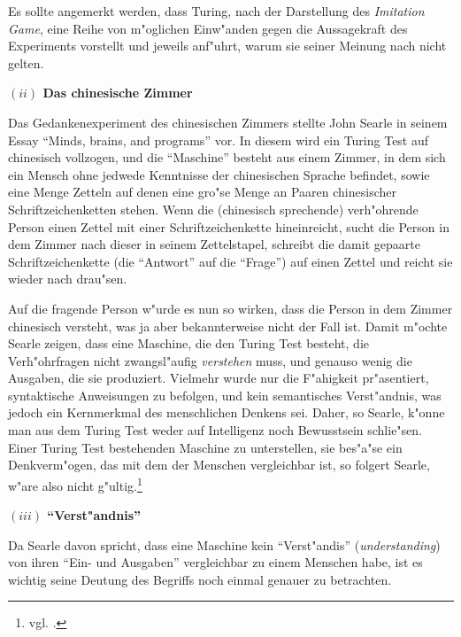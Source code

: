 \documentclass[a4paper, emulatestandardclasses, 12pt]{scrartcl}
\begin{document}
\begin{onehalfspace}
Es sollte angemerkt werden, dass Turing, nach der Darstellung des \emph{Imitation Game}, eine Reihe von m"oglichen Einw"anden gegen die Aussagekraft des Experiments vorstellt und jeweils anf"uhrt, warum sie seiner Meinung nach nicht gelten. %

\vspace{5mm}
\noindent\textbf{$(ii)$ Das chinesische Zimmer}

\noindent Das Gedankenexperiment des chinesischen Zimmers stellte John Searle in seinem Essay "`Minds, brains, and programs"' vor. In diesem wird ein Turing Test auf chinesisch vollzogen, und die "`Maschine"' besteht aus einem Zimmer, in dem sich ein Mensch ohne jedwede Kenntnisse der chinesischen Sprache befindet, sowie eine Menge Zetteln auf denen eine gro"se Menge an Paaren chinesischer Schriftzeichenketten stehen. Wenn die (chinesisch sprechende) verh"ohrende Person einen Zettel mit einer Schriftzeichenkette hineinreicht, sucht die Person in dem Zimmer nach dieser in seinem Zettelstapel, schreibt die damit gepaarte Schriftzeichenkette (die "`Antwort"' auf die "`Frage"') auf einen Zettel und reicht sie wieder nach drau"sen. 

Auf die fragende Person w"urde es nun so wirken, dass die Person in dem Zimmer chinesisch versteht, was ja aber bekannterweise nicht der Fall ist. Damit m"ochte Searle zeigen, dass eine Maschine, die den Turing Test besteht, die Verh"ohrfragen nicht zwangsl"aufig \emph{verstehen} muss, und genauso wenig die Ausgaben, die sie produziert. Vielmehr wurde nur die F"ahigkeit pr"asentiert, syntaktische Anweisungen zu befolgen, und kein semantisches Verst"andnis, was jedoch ein Kernmerkmal des menschlichen Denkens sei. Daher, so Searle, k"onne man aus dem Turing Test weder auf Intelligenz noch Bewusstsein schlie"sen. Einer Turing Test bestehenden Maschine zu unterstellen, sie bes"a"se ein Denkverm"ogen, das mit dem der Menschen vergleichbar ist, so folgert Searle, w"are also nicht g"ultig.\footnote{vgl. \cite[S.????]{searle1980minds}.}

\vspace{5mm}
\noindent\textbf{$(iii)$ "`Verst"andnis"'}

\noindent Da Searle davon spricht, dass eine Maschine kein "`Verst"andis"' (\emph{understanding}) von ihren "`Ein- und Ausgaben"' vergleichbar zu einem Menschen habe, ist es wichtig seine Deutung des Begriffs noch einmal genauer zu betrachten.


\end{onehalfspace}
\end{document}
